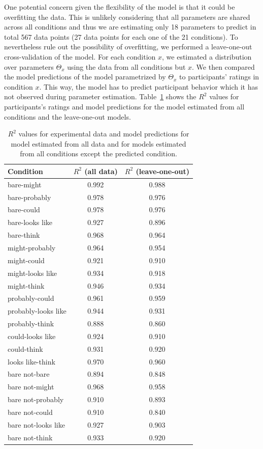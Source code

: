 \documentclass[man, floatsintext]{apa6}
\begin{document}
One potential concern given the flexibility of the model is that it could be overfitting the data. 
This is unlikely considering that all parameters are shared across all conditions and thus we are estimating only 18 parameters to predict in total 567 data points 
(27 data points for each one of the 21 conditions). To nevertheless rule out the possibility of overfitting, we performed a leave-one-out cross-validation of
the model. For each condition $x$, we estimated a distribution over parameters $\Theta_x$ using the data from all conditions but $x$. We then
compared the model predictions of the model parametrized by $\Theta_x$ to participants' ratings in condition $x$. This way, the model has to predict
participant behavior which it has not observed during parameter estimation. Table~\ref{tbl:correlations} shows the $R^2$ values for participants's
ratings and model predictions for the model estimated from all conditions and the leave-one-out models.

\begin{table}[ht!]
\center
\begin{tabular}{l | c | c}
      Condition & $R^2$ (all data) & $R^2$ (leave-one-out) \\
      \midrule
          bare-might  &  0.992  & 0.988 \\
       bare-probably  &  0.978  & 0.976 \\
          bare-could  &  0.978  & 0.976 \\
     bare-looks like  &  0.927  & 0.896 \\
          bare-think  &  0.968  & 0.964 \\
      might-probably  &  0.964  & 0.954 \\
         might-could  &  0.921  & 0.910 \\
    might-looks like  &  0.934  & 0.918 \\
         might-think  &  0.946  & 0.934 \\
      probably-could  &  0.961  & 0.959 \\
 probably-looks like  &  0.944  & 0.931 \\
      probably-think  &  0.888  & 0.860 \\
    could-looks like  &  0.924  & 0.910 \\
         could-think  &  0.931  & 0.920 \\
    looks like-think  &  0.970  & 0.960 \\
       bare not-bare  &  0.894  & 0.848 \\
      bare not-might  &  0.968  & 0.958 \\
   bare not-probably  &  0.910  & 0.893 \\
      bare not-could  &  0.910  & 0.840 \\
 bare not-looks like  &  0.927  & 0.903 \\
      bare not-think  &  0.933  & 0.920 \\
\end{tabular}
\caption{$R^2$ values for experimental data and model predictions for model estimated from all data and for models estimated from all conditions except the predicted condition. \label{tbl:correlations}}
\end{table}
\end{document}
